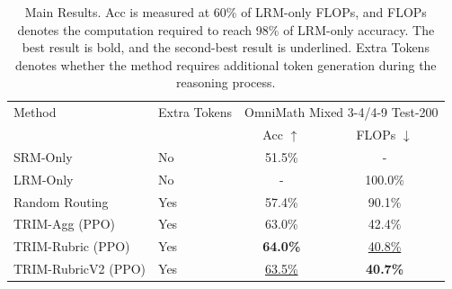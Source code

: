 \begin{table}[t]
\centering
\small
\begin{tabular}{llcc}
\toprule
Method & Extra Tokens & \multicolumn{2}{c}{OmniMath Mixed 3-4/4-9 Test-200} &  \\
 &  & Acc $\uparrow$ & FLOPs $\downarrow$ \\
\midrule
SRM-Only & No & 51.5\% & - \\
LRM-Only & No & - & 100.0\% \\
Random Routing & Yes & 57.4\% & 90.1\% \\
TRIM-Agg (PPO) & Yes & 63.0\% & 42.4\% \\
TRIM-Rubric (PPO) & Yes & \textbf{64.0\%} & \underline{40.8\%} \\
TRIM-RubricV2 (PPO) & Yes & \underline{63.5\%} & \textbf{40.7\%} \\
\bottomrule
\end{tabular}
\caption{Main Results. Acc is measured at 60\% of LRM-only FLOPs, and FLOPs denotes the computation required to reach 98\% of LRM-only accuracy. The best result is bold, and the second-best result is underlined. Extra Tokens denotes whether the method requires additional token generation during the reasoning process.}
\end{table}
